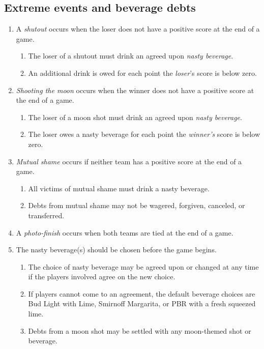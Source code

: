 \documentclass[11pt,letterpaper,twocolumn,english,DIV=calc]{scrartcl}
\begin{document}
\subsection{Extreme events and beverage debts}
\begin{enumerate}[leftmargin=2.8em, label=\thesubsection.\arabic*]
	\item A \emph{shutout} occurs when the loser does not have a positive score at the end of a game.

	\begin{enumerate}
		\item The loser of a shutout must drink an agreed upon \emph{nasty beverage}.
		\item An additional drink is owed for each point the \emph{loser}'s score is below zero.
	\end{enumerate}

	\item \emph{Shooting the moon} occurs when the winner does not have a positive score at the end of a game.

	\begin{enumerate}
		\item The loser of a moon shot must drink an agreed upon \emph{nasty beverage}.
		\item The loser owes a nasty beverage for each point the \emph{winner's} score is below zero.
	\end{enumerate}

	\item \emph{Mutual shame} occurs if neither team has a positive score at the end of a game.

	\begin{enumerate}
		\item All victims of mutual shame must drink a nasty beverage.
		\item Debts from mutual shame may not be wagered, forgiven, canceled, or transferred.
	\end{enumerate}

	\item A \emph{photo-finish} occurs when both teams are tied at the end of a game.
	\item The nasty beverage(s) should be chosen before the game begins.

	\begin{enumerate}
		\item The choice of nasty beverage may be agreed upon or changed at any time if the players involved agree on the new choice.
		\item If players cannot come to an agreement, the default beverage choices are Bud Light with Lime, Smirnoff Margarita, or PBR with a fresh squeezed lime.
		\item Debts from a moon shot may be settled with any moon-themed shot or beverage.
	\end{enumerate}


\end{enumerate}
\end{document}
